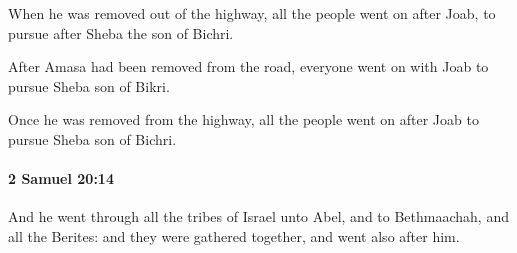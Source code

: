 			\begin{versebox}
					\item[BHS] 
					\item[ASV] When he was removed out of the highway, all the people went on after Joab, to pursue after Sheba the son of Bichri.
					\item[NIV] After Amasa had been removed from the road, everyone went on with Joab to pursue Sheba son of Bikri.
					\item[NRSV] Once he was removed from the highway, all the people went on after Joab to pursue Sheba son of Bichri.
			\end{versebox}

		\paragraph{2 Samuel 20:14} %
			\label{2SAMUEL-20-14}

			And he went through all the tribes of Israel unto Abel, and to Bethmaachah, and all the Berites: and they were gathered together, and went also after him.

